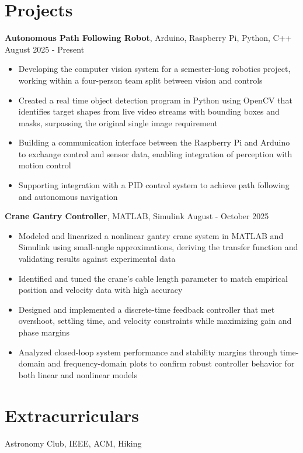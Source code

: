 \documentclass[11pt]{article}
\begin{document}
\section*{Projects}

\textbf{Autonomous Path Following Robot}, Arduino, Raspberry Pi, Python, C++  \hfill August 2025 - Present
\begin{itemize}
  \item Developing the computer vision system for a semester-long robotics project, working within a four-person team split between vision and controls
  \item Created a real time object detection program in Python using OpenCV that identifies target shapes from live video streams with bounding boxes and masks, surpassing the original single image requirement
  \item Building a communication interface between the Raspberry Pi and Arduino to exchange control and sensor data, enabling integration of perception with motion control
  \item Supporting integration with a PID control system to achieve path following and autonomous navigation
\end{itemize}

\vspace{4pt}

\textbf{Crane Gantry Controller}, MATLAB, Simulink  \hfill August - October 2025
\begin{itemize}
  \item Modeled and linearized a nonlinear gantry crane system in MATLAB and Simulink using small-angle approximations, deriving the transfer function and validating results against experimental data
  \item Identified and tuned the crane's cable length parameter to match empirical position and velocity data with high accuracy
  \item Designed and implemented a discrete-time feedback controller that met overshoot, settling time, and velocity constraints while maximizing gain and phase margins
  \item Analyzed closed-loop system performance and stability margins through time-domain and frequency-domain plots to confirm robust controller behavior for both linear and nonlinear models
\end{itemize}

\section*{Extracurriculars}
\small Astronomy Club, IEEE, ACM, Hiking
\end{document}
